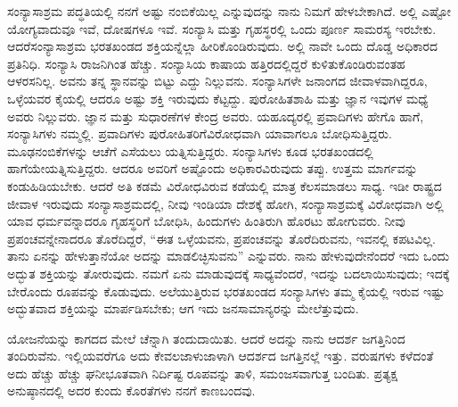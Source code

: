 ಸಂನ್ಯಾಸಾಶ್ರಮ ಪದ್ಧತಿಯಲ್ಲಿ ನನಗೆ ಅಷ್ಟು ನಂಬಿಕೆಯಿಲ್ಲ ಎನ್ನುವುದನ್ನು ನಾನು ನಿಮಗೆ ಹೇಳಬೇಕಾಗಿದೆ. ಅಲ್ಲಿ ಎಷ್ಟೋ ಯೋಗ್ಯವಾದುವೂ ಇವೆ, ದೋಷಗಳೂ ಇವೆ. ಸಂನ್ಯಾಸಿ ಮತ್ತು ಗೃಹಸ್ಥರಲ್ಲಿ ಒಂದು ಪೂರ್ಣ ಸಾಮರಸ್ಯ ಇರಬೇಕು. ಆದರೆ\break ಸಂನ್ಯಾಸಾಶ್ರಮ ಭರತಖಂಡದ ಶಕ್ತಿಯನ್ನೆಲ್ಲಾ ಹೀರಿಕೊಂಡಿರುವುದು. ಅಲ್ಲಿ ನಾವೇ ಒಂದು ದೊಡ್ಡ ಅಧಿಕಾರದ ಪ್ರತಿನಿಧಿ. ಸಂನ್ಯಾಸಿ ರಾಜನಿಗಿಂತ ಹೆಚ್ಚು. ಸಂನ್ಯಾಸಿಯ ಕಾಷಾಯ ಹತ್ತಿರದಲ್ಲಿದ್ದರೆ ಕುಳಿತುಕೊಂಡಿರುವಂತಹ ಆಳರಸನಿಲ್ಲ. ಅವನು ತನ್ನ ಸ್ಥಾನವನ್ನು ಬಿಟ್ಟು ಎದ್ದು ನಿಲ್ಲುವನು. ಸಂನ್ಯಾಸಿಗಳೇ ಜನಾಂಗದ ಜೀವಾಳವಾಗಿದ್ದರೂ, ಒಳ್ಳೆಯವರ ಕೈಯಲ್ಲಿ ಆದರೂ ಅಷ್ಟು ಶಕ್ತಿ ಇರುವುದು ಕೆಟ್ಟದ್ದು. ಪುರೋಹಿತಶಾಹಿ ಮತ್ತು ಜ್ಞಾನ ಇವುಗಳ ಮಧ್ಯೆ ಅವರು ನಿಲ್ಲುವರು. ಜ್ಞಾನ ಮತ್ತು ಸುಧಾರಣೆಗಳ ಕೇಂದ್ರ ಅವರು. ಯಹೂದ್ಯರಲ್ಲಿ ಪ್ರವಾದಿಗಳು ಹೇಗೊ ಹಾಗೆ, ಸಂನ್ಯಾಸಿಗಳು ನಮ್ಮಲ್ಲಿ. ಪ್ರವಾದಿಗಳು ಪುರೋಹಿತರಿಗೆ\break ವಿರೋಧವಾಗಿ ಯಾವಾಗಲೂ ಬೋಧಿಸುತ್ತಿದ್ದರು. ಮೂಢನಂಬಿಕೆಗಳನ್ನು ಆಚೆಗೆ ಎಸೆಯಲು ಯತ್ನಿಸುತ್ತಿದ್ದರು. ಸಂನ್ಯಾಸಿಗಳು ಕೂಡ ಭರತಖಂಡದಲ್ಲಿ ಹಾಗೆಯೇ\break ಯತ್ನಿಸುತ್ತಿದ್ದರು. ಆದರೂ ಅವರಿಗೆ ಅಷ್ಟೊಂದು ಅಧಿಕಾರವಿರುವುದು ತಪ್ಪು. ಉತ್ತಮ ಮಾರ್ಗವನ್ನು ಕಂಡುಹಿಡಿಯಬೇಕು. ಆದರೆ ಅತಿ ಕಡಮೆ ವಿರೋಧವಿರುವ ಕಡೆಯಲ್ಲಿ ಮಾತ್ರ ಕೆಲಸಮಾಡಲು ಸಾಧ್ಯ. ಇಡೀ ರಾಷ್ಟ್ರದ ಜೀವಾಳ ಇರುವುದು ಸಂನ್ಯಾಸಾಶ್ರಮದಲ್ಲಿ, ನೀವು ಇಂಡಿಯಾ ದೇಶಕ್ಕೆ ಹೋಗಿ, ಸಂನ್ಯಾಸಾಶ್ರಮಕ್ಕೆ ವಿರೋಧವಾಗಿ ಅಲ್ಲಿ ಯಾವ ಧರ್ಮವನ್ನಾದರೂ ಗೃಹಸ್ಥರಿಗೆ ಬೋಧಿಸಿ, ಹಿಂದುಗಳು ಹಿಂತಿರುಗಿ ಹೊರಟು ಹೋಗುವರು. ನೀವು ಪ್ರಪಂಚವನ್ನೇನಾದರೂ ತೊರೆದಿದ್ದರೆ, “ಈತ ಒಳ್ಳೆಯವನು, ಪ್ರಪಂಚವನ್ನು ತೊರೆದಿರುವನು, ಇವನಲ್ಲಿ ಕಪಟವಿಲ್ಲ. ತಾನು ಏನನ್ನು ಹೇಳುತ್ತಾನೆಯೋ ಅದನ್ನು ಮಾಡಲಿಚ್ಛಿಸುವನು” ಎನ್ನುವರು. ನಾನು ಹೇಳುವುದೇನೆಂದರೆ ಇದು ಒಂದು ಅದ್ಭುತ ಶಕ್ತಿಯನ್ನು ತೋರುವುದು. ನಮಗೆ ಏನು ಮಾಡುವುದಕ್ಕೆ ಸಾಧ್ಯವೆಂದರೆ, ಇದನ್ನು ಬದಲಾಯಿಸುವುದು; ಇದಕ್ಕೆ ಬೇರೊಂದು ರೂಪವನ್ನು ಕೊಡುವುದು. ಅಲೆಯುತ್ತಿರುವ ಭರತಖಂಡದ ಸಂನ್ಯಾಸಿಗಳು ತಮ್ಮ ಕೈಯಲ್ಲಿ ಇರುವ ಇಷ್ಟು ಅದ್ಭುತವಾದ ಶಕ್ತಿಯನ್ನು ಮಾರ್ಪಡಿಸಬೇಕು; ಆಗ ಇದು ಜನಸಾಮಾನ್ಯರನ್ನು ಮೇಲೆತ್ತುವುದು.

ಯೋಜನೆಯನ್ನು ಕಾಗದದ ಮೇಲೆ ಚೆನ್ನಾಗಿ ತಂದುದಾಯಿತು. ಆದರೆ ಅದನ್ನು ನಾನು ಆದರ್ಶ ಜಗತ್ತಿನಿಂದ ತಂದಿರುವೆನು. ಇಲ್ಲಿಯವರೆಗೂ ಅದು ಕೇವಲ\break ಜಾಳುಜಾಳಾಗಿ ಆದರ್ಶದ ಜಗತ್ತಿನಲ್ಲೆ ಇತ್ತು. ವರುಷಗಳು ಕಳೆದಂತೆ ಅದು ಹೆಚ್ಚು ಹೆಚ್ಚು ಘನೀಭೂತವಾಗಿ ನಿರ್ದಿಷ್ಟ ರೂಪವನ್ನು ತಾಳಿ, ಸಮಂಜಸವಾಗುತ್ತ ಬಂದಿತು. ಪ್ರತ್ಯಕ್ಷ ಅನುಷ್ಠಾನದಲ್ಲಿ ಅದರ ಕುಂದು ಕೊರತೆಗಳು ನನಗೆ ಕಾಣಬಂದವು.

